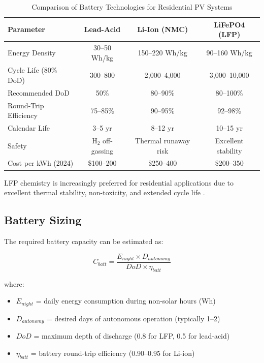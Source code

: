 \begin{table}[H]
\centering
\caption{Comparison of Battery Technologies for Residential PV Systems}
\label{tab:battery_comparison}
\small
\begin{tabular}{@{}p{3.8cm} c c c@{}}
\toprule
\textbf{Parameter} & \textbf{Lead-Acid} & \textbf{Li-Ion (NMC)} & \textbf{LiFePO4 (LFP)} \\
\midrule
Energy Density & 30--50 Wh/kg & 150--220 Wh/kg & 90--160 Wh/kg \\
Cycle Life (80\% DoD) & 300--800 & 2,000--4,000 & 3,000--10,000 \\
Recommended DoD & 50\% & 80--90\% & 80--100\% \\
Round-Trip Efficiency & 75--85\% & 90--95\% & 92--98\% \\
Calendar Life & 3--5 yr & 8--12 yr & 10--15 yr \\
Safety & H$_2$ off-gassing & Thermal runaway risk & Excellent stability \\
Cost per kWh (2024) & \$100--200 & \$250--400 & \$200--350 \\
\bottomrule
\end{tabular}
\end{table}

LFP chemistry is increasingly preferred for residential applications due to excellent thermal stability, non-toxicity, and extended cycle life \cite{zakeri2015,hesse2017}.


\subsection{Battery Sizing}

The required battery capacity can be estimated as:

\begin{equation}
    C_{batt} = \frac{E_{night} \times D_{autonomy}}{DoD \times \eta_{batt}}
    \label{eq:battery_sizing}
\end{equation}

\noindent where:
\begin{itemize}
    \item $E_{night}$ = daily energy consumption during non-solar hours (Wh)
    \item $D_{autonomy}$ = desired days of autonomous operation (typically 1--2)
    \item $DoD$ = maximum depth of discharge (0.8 for LFP, 0.5 for lead-acid)
    \item $\eta_{batt}$ = battery round-trip efficiency (0.90--0.95 for Li-ion)
\end{itemize}

